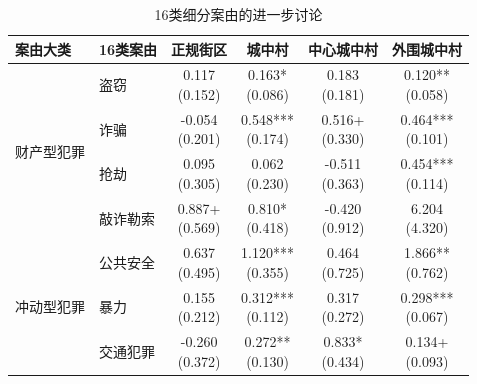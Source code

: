 \documentclass[a4paper,12pt]{report}
\begin{document}
\begin{table}[H]
\centering
\caption{16类细分案由的进一步讨论}
\label{tab:hetero_16cat}
\begingroup
\setlength{\tabcolsep}{1.2pt}
\renewcommand{\arraystretch}{0.75}
\begin{tabular*}{\textwidth}{@{\extracolsep{\fill}}llcccc}
\toprule
案由大类 & 16类案由 & 正规街区 & 城中村 & 中心城中村 & 外围城中村 \\
\midrule
\multirow{4}{*}{财产型犯罪} & 盗窃 & \makecell{0.117\\(0.152)} & \makecell{0.163*\\(0.086)} & \makecell{0.183\\(0.181)} & \makecell{0.120**\\(0.058)} \\
 & 诈骗 & \makecell{-0.054\\(0.201)} & \makecell{0.548***\\(0.174)} & \makecell{0.516+\\(0.330)} & \makecell{0.464***\\(0.101)} \\
 & 抢劫 & \makecell{0.095\\(0.305)} & \makecell{0.062\\(0.230)} & \makecell{-0.511\\(0.363)} & \makecell{0.454***\\(0.114)} \\
 & 敲诈勒索 & \makecell{0.887+\\(0.569)} & \makecell{0.810*\\(0.418)} & \makecell{-0.420\\(0.912)} & \makecell{6.204\\(4.320)} \\
\midrule
\multirow{3}{*}{冲动型犯罪} & 公共安全 & \makecell{0.637\\(0.495)} & \makecell{1.120***\\(0.355)} & \makecell{0.464\\(0.725)} & \makecell{1.866**\\(0.762)} \\
 & 暴力 & \makecell{0.155\\(0.212)} & \makecell{0.312***\\(0.112)} & \makecell{0.317\\(0.272)} & \makecell{0.298***\\(0.067)} \\
 & 交通犯罪 & \makecell{-0.260\\(0.372)} & \makecell{0.272**\\(0.130)} & \makecell{0.833*\\(0.434)} & \makecell{0.134+\\(0.093)} \\

\end{tabular*}
\end{table}
\end{document}
